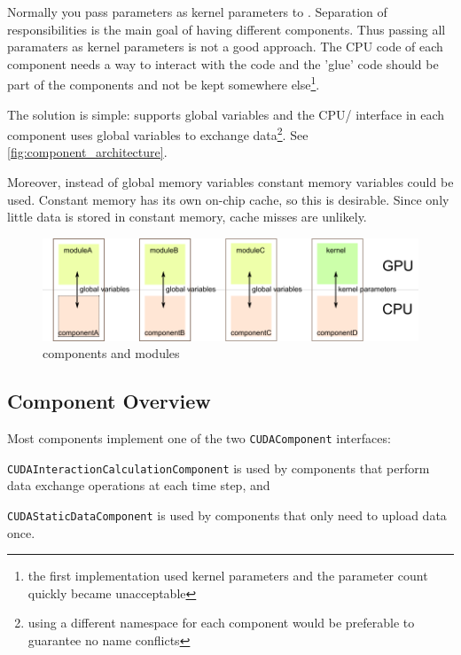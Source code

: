 Normally you pass parameters as kernel parameters to \cuda{}. Separation of responsibilities is the main goal of having different components. Thus passing all paramaters as kernel parameters is not a good approach. The CPU code of each component needs a way to interact with the \cuda{} code and the 'glue' code should be part of the components and not be kept somewhere else\footnote{the first implementation used kernel parameters and the parameter count quickly became unacceptable}.

The solution is simple: \cuda{} supports global variables and the CPU/\cuda{} interface in each component uses global variables to exchange data\footnote{using a different namespace for each component would be preferable to guarantee no name conflicts}. See \autoref{fig:component_architecture}.

Moreover, instead of global memory variables constant memory variables could be used. Constant memory has its own on-chip cache, so this is desirable. Since only little data is stored in constant memory, cache misses are unlikely.

\begin{figure}
\includegraphics{figures/component_architecture.pdf}
\caption{components and \cuda{} modules}
\label{fig:component_architecture}
\end{figure}

\subsection{Component Overview}
Most components implement one of the two \lstinline!CUDAComponent! interfaces:
\begin{compactitem}
\item \lstinline!CUDAInteractionCalculationComponent! is used by components that perform data exchange operations at each time step, and
\item \lstinline!CUDAStaticDataComponent! is used by components that only need to upload data once.
\end{compactitem}

